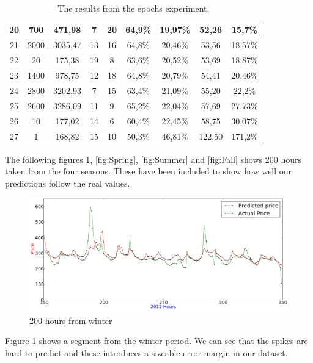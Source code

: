 \begin{table}[H]
{\begin{tabular}{|c|c|c|c|c|c|c|c|c|}
	20 & 700  & 471,98 & 7  & 20 & 64,9\% & 19,97\% & 52,26 & 15,7\% \\ \hline
	21 & 2000 & 3035,47 & 13 & 16 & 64,8\% & 20,46\% & 53,56 & 18,57\% \\ \hline
	22 & 20   & 175,38 & 19 & 8  & 63,6\% & 20,52\% & 53,69 & 18,87\% \\ \hline
	23 & 1400 & 978,75 & 12 & 18 & 64,8\% & 20,79\% & 54,41 & 20,46\% \\ \hline
	24 & 2800 & 3202,93 & 7  & 15 & 63,4\% & 21,09\% & 55,20 & 22,2\% \\ \hline
	25 & 2600 & 3286,09 & 11 & 9  & 65,2\% & 22,04\% & 57,69 & 27,73\% \\ \hline
	26 & 10   & 177,02 & 14 & 6  & 60,4\% & 22,45\% & 58,75 & 30,07\% \\ \hline
	27 & 1    & 168,82 & 15 & 10 & 50,3\% & 46,81\% & 122,50 & 171,2\% \\ \hline
	\end{tabular}
}
\caption{The results from the epochs experiment.} %
\label{table:Epochs} %
\end{table}

The following figures \ref{fig:Winter}, \ref{fig:Spring}, \ref{fig:Summer} and \ref{fig:Fall} shows 200 hours taken from the four seasons. These have been included to show how well our predictions follow the real values.
\begin{figure}[H]
\centering
\includegraphics[width=\linewidth]{billeder/PriceExperimentalAnalysis/winter.jpg}
\caption{200 hours from winter}
\label{fig:Winter}
\end{figure}

Figure \ref{fig:Winter} shows a segment from the winter period. We can see that the spikes are hard to predict and these introduces a sizeable error margin in our dataset.


